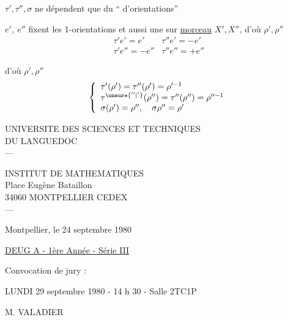 $\tau',\tau'',\sigma$ ne dépendent que du `` d'orientations''

$e',\ e''$ fixent les 1-orientations et aussi une  sur  \uline{morceau} $X',X''$, d'où $\rho',\rho''$
\[
\begin{array}{ll}
\tau'e'=e' & \tau''e'=-e'\\
\tau'e''=-e'' & \tau''e''=+e''
\end{array}
\]

d'où $\rho',\rho''$
\[
\left\{\begin{array}{l}
\tau'(\rho')=\tau''(\rho')=\rho^{\prime-1}\\
\tau^{\unsure{''|'}}(\rho'')=\tau''(\rho'')=\rho^{\prime\prime-1}\\
\sigma(\rho')=\rho'',\quad\sigma\rho''=\rho'
\end{array}\right.
\]



UNIVERSITE DES SCIENCES ET TECHNIQUES\\
DU LANGUEDOC\\
---

INSTITUT DE MATHEMATIQUES\\
Place Eugène Bataillon\\
34060 MONTPELLIER CEDEX\\
---

Montpellier, le 24 septembre 1980

\uline{DEUG A - 1ère Année - Série III}

Convocation de jury :

LUNDI 29 septembre 1980 - 14 h 30 - Salle 2TC1P

M. VALADIER




